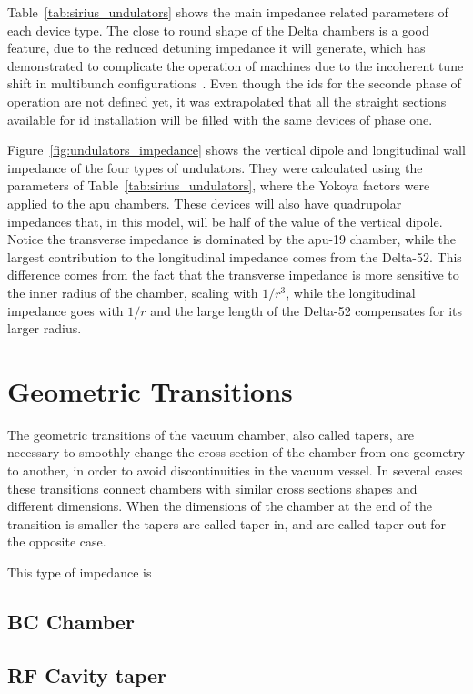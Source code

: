     Table~\ref{tab:sirius_undulators} shows the main impedance related parameters of each device type. The close to round shape of the Delta chambers is a good feature, due to the reduced detuning impedance it will generate, which has demonstrated to complicate the operation of machines due to the incoherent tune shift in multibunch configurations~\cite{Nagaoka2001}. Even though the \gls{ids} for the seconde phase of operation are not defined yet, it was extrapolated that all the straight sections available for \gls{id} installation will be filled with the same devices of phase one.

    Figure~\ref{fig:undulators_impedance} shows the vertical dipole and longitudinal wall impedance of the four types of undulators. They were calculated using the parameters of Table~\ref{tab:sirius_undulators}, where the Yokoya factors were applied to the \gls{apu} chambers. These devices will also have quadrupolar impedances that, in this model, will be half of the value of the vertical dipole. Notice the transverse impedance is dominated by the \gls{apu}-19 chamber, while the largest contribution to the longitudinal impedance comes from the Delta-52. This difference comes from the fact that the transverse impedance is more sensitive to the inner radius of the chamber, scaling with $1/r^3$, while the longitudinal impedance goes with $1/r$ and the large length of the Delta-52 compensates for its larger radius.

\section{Geometric Transitions}

    The geometric transitions of the vacuum chamber, also called tapers, are necessary to smoothly change the cross section of the chamber from one geometry to another, in order to avoid discontinuities in the vacuum vessel. In several cases these transitions connect chambers with similar cross sections shapes and different dimensions. When the dimensions of the chamber at the end of the transition is smaller the tapers are called taper-in, and are called taper-out for the opposite case.

    This type of impedance is

\subsection{BC Chamber}
\subsection{RF Cavity taper}

